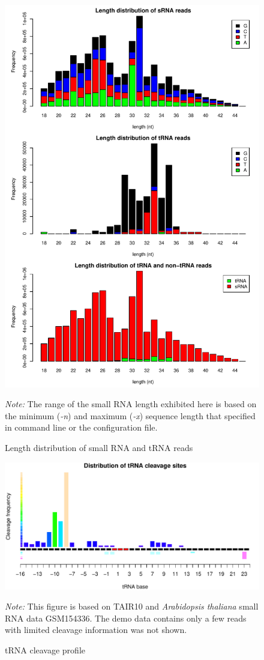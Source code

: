 \documentclass[11pt, a4paper]{article}
\begin{document}
\begin{figure}[htbp]
\begin{center}
\includegraphics[width=12cm]{distribution.pdf}
\caption{Length distribution of small RNA and tRNA reads}
\label{distribution}
\end{center}
\emph{Note:} The range of the small RNA length exhibited here is based on the minimum (\emph{-n}) and maximum (\emph{-x}) sequence length that specified in command line or the configuration file.
\end{figure}


\begin{figure}[htbp]
\begin{center}
\includegraphics[width=13cm]{cleavage_profile.pdf}
\caption{tRNA cleavage profile}
\label{cleavage}
\end{center}
\emph{Note:} This figure is based on TAIR10 and \textit{Arabidopsis thaliana} small RNA data GSM154336. The demo data contains only a few reads with limited cleavage information was not shown.
\end{figure}
\end{document}
